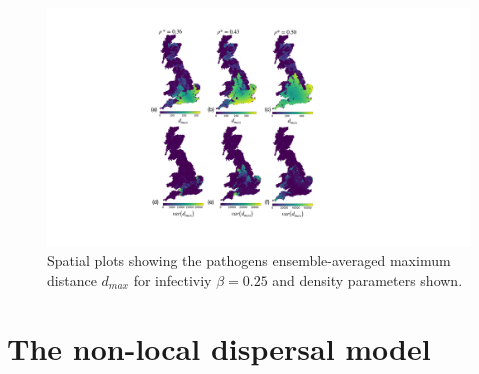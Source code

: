 \begin{figure}
    \centering
    \includegraphics[scale=0.55]{appendix/figures/A-ch4figure1.pdf}
    \caption{Spatial plots showing the pathogens ensemble-averaged maximum distance $d_{max}$ for infectiviy $\beta=0.25$ and density parameters shown.}
    \label{fig:max-distance-metrix}
\end{figure}

\chapter{The non-local dispersal model}
\label{section:apendix_A}

